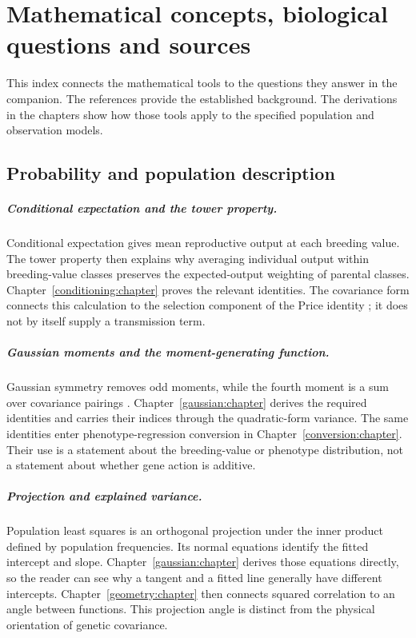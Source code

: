 \chapter{Mathematical concepts, biological questions and sources}
\label{concepts:chapter}

This index connects the mathematical tools to the questions they answer in the companion. The references provide the established background. The derivations in the chapters show how those tools apply to the specified population and observation models.

\section{Probability and population description}

\paragraph{Conditional expectation and the tower property.}
Conditional expectation gives mean reproductive output at each breeding value. The tower property then explains why averaging individual output within breeding-value classes preserves the expected-output weighting of parental classes. Chapter~\ref{conditioning:chapter} proves the relevant identities. The covariance form connects this calculation to the selection component of the Price identity \citep{Price1970}; it does not by itself supply a transmission term.

\paragraph{Gaussian moments and the moment-generating function.}
Gaussian symmetry removes odd moments, while the fourth moment is a sum over covariance pairings \citep{Isserlis1918}. Chapter~\ref{gaussian:chapter} derives the required identities and carries their indices through the quadratic-form variance. The same identities enter phenotype-regression conversion in Chapter~\ref{conversion:chapter}. Their use is a statement about the breeding-value or phenotype distribution, not a statement about whether gene action is additive.

\paragraph{Projection and explained variance.}
Population least squares is an orthogonal projection under the inner product defined by population frequencies. Its normal equations identify the fitted intercept and slope. Chapter~\ref{gaussian:chapter} derives those equations directly, so the reader can see why a tangent and a fitted line generally have different intercepts. Chapter~\ref{geometry:chapter} then connects squared correlation to an angle between functions. This projection angle is distinct from the physical orientation of genetic covariance.

